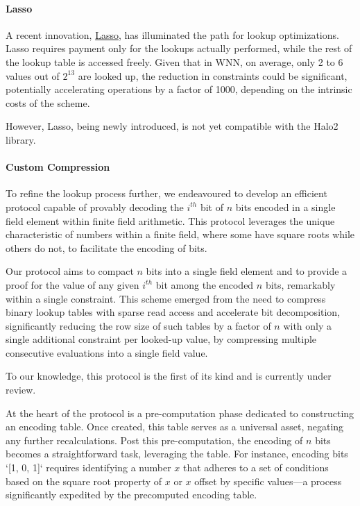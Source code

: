 \documentclass{article}[12pt]
\begin{document}
\paragraph{Lasso}

A recent innovation, \href{https://eprint.iacr.org/2023/1216}{Lasso}, has illuminated the path for lookup optimizations.
Lasso requires payment only for the lookups actually performed, while the rest of the lookup table is accessed freely.
Given that in WNN, on average, only 2 to 6 values out of \(2^{13}\) are looked up, the reduction in constraints could be significant, potentially accelerating operations by a factor of 1000, depending on the intrinsic costs of the scheme.

However, Lasso, being newly introduced, is not yet compatible with the Halo2 library.

\paragraph{Custom Compression}

To refine the lookup process further, we endeavoured to develop an efficient protocol capable of provably decoding the $i^{th}$ bit of $n$ bits encoded in a single field element within finite field arithmetic.
This protocol leverages the unique characteristic of numbers within a finite field, where some have square roots while others do not, to facilitate the encoding of bits.

Our protocol aims to compact $n$ bits into a single field element and to provide a proof for the value of any given $i^{th}$ bit among the encoded $n$ bits, remarkably within a single constraint.
This scheme emerged from the need to compress binary lookup tables with sparse read access and accelerate bit decomposition, significantly reducing the row size of such tables by a factor of $n$ with only a single additional constraint per looked-up value, by compressing multiple consecutive evaluations into a single field value.

To our knowledge, this protocol is the first of its kind and is currently under review.

At the heart of the protocol is a pre-computation phase dedicated to constructing an encoding table.
Once created, this table serves as a universal asset, negating any further recalculations.
Post this pre-computation, the encoding of $n$ bits becomes a straightforward task, leveraging the table.
For instance, encoding bits `[1, 0, 1]` requires identifying a number $x$ that adheres to a set of conditions based on the square root property of $x$ or $x$ offset by specific values—a process significantly expedited by the precomputed encoding table.
\end{document}
